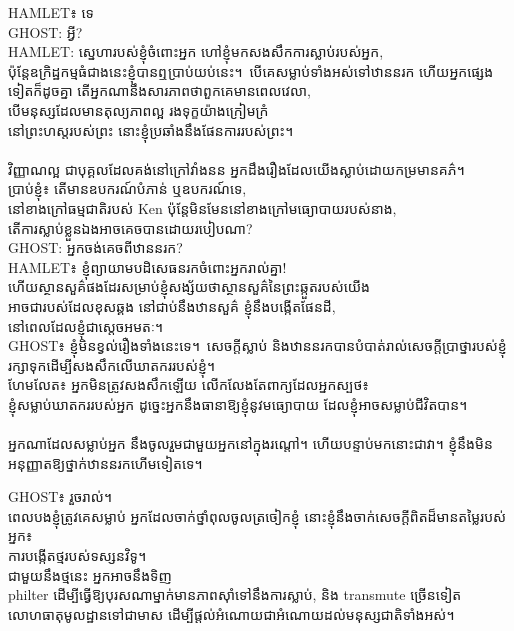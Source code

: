\begin{playdialog}
HAMLET៖ ទេ\\

GHOST: អ្វី?\\

HAMLET: ស្នេហារបស់ខ្ញុំចំពោះអ្នក ហៅខ្ញុំមកសងសឹកការស្លាប់របស់អ្នក,\\
ប៉ុន្តែ​ឧក្រិដ្ឋកម្ម​ធំ​ជាង​នេះ​ខ្ញុំ​បាន​ឮ​ប្រាប់​យប់​នេះ។\
បើ​គេ​សម្លាប់​ទាំង​អស់​ទៅ​ឋាន​នរក ហើយ​អ្នក​ផ្សេង​ទៀត​ក៏​ដូច​គ្នា
តើអ្នកណានឹងសារភាពថាពួកគេមានពេលវេលា,\\
បើមនុស្សដែលមានតុល្យភាពល្អ រងទុក្ខយ៉ាងក្រៀមក្រំ\\
នៅព្រះហស្តរបស់ព្រះ នោះខ្ញុំប្រឆាំងនឹងផែនការរបស់ព្រះ។\\
\\
វិញ្ញាណល្អ ជាបុគ្គលដែលគង់នៅក្រៅវាំងនន
អ្នកដឹងរឿងដែលយើងស្លាប់ដោយកម្រមានគភ៌។\\
ប្រាប់ខ្ញុំ៖ តើមានឧបករណ៍បំភាន់ ឬឧបករណ៍ទេ,\\
នៅខាងក្រៅធម្មជាតិរបស់ Ken ប៉ុន្តែមិនមែននៅខាងក្រៅមធ្យោបាយរបស់នាង,\\
តើការស្លាប់ខ្លួនឯងអាចគេចបានដោយរបៀបណា?\\

GHOST: អ្នកចង់គេចពីឋាននរក?\\

HAMLET៖ ខ្ញុំព្យាយាមបដិសេធនរកចំពោះអ្នករាល់គ្នា!\\
ហើយស្ថានសួគ៌ផងដែរសម្រាប់ខ្ញុំសង្ស័យថាស្ថានសួគ៌នៃព្រះឆ្កួតរបស់យើង\\
អាចជារបស់ដែលខុសឆ្គង នៅជាប់នឹងឋានសួគ៌ ខ្ញុំនឹងបង្កើតផែនដី,\\
នៅពេលដែលខ្ញុំជាស្តេចអមតៈ។\\

GHOST៖ ខ្ញុំមិនខ្វល់រឿងទាំងនេះទេ។\
សេចក្តីស្លាប់ និងឋាននរកបានបំបាត់រាល់សេចក្តីប្រាថ្នារបស់ខ្ញុំ
រក្សាទុកដើម្បីសងសឹកលើឃាតកររបស់ខ្ញុំ។\\

ហែមលែត៖ អ្នក​មិន​ត្រូវ​សងសឹក​ឡើយ លើក​លែង​តែ​ពាក្យ​ដែល​អ្នក​ស្បថ៖\\
ខ្ញុំ​សម្លាប់​ឃាតករ​របស់​អ្នក ដូច្នេះ​អ្នក​នឹង​ធានា​ឱ្យ​ខ្ញុំ​នូវ​មធ្យោបាយ
ដែលខ្ញុំអាចសម្លាប់ជីវិតបាន។\\
\\
អ្នកណាដែលសម្លាប់អ្នក នឹងចូលរួមជាមួយអ្នកនៅក្នុងរណ្តៅ។
ហើយបន្ទាប់មកនោះជាវា។ ខ្ញុំ​នឹង​មិន​អនុញ្ញាត​ឱ្យ​ថ្នាក់​ឋាននរក​ហើម​ទៀត​ទេ។\

GHOST៖ រួចរាល់។\\
ពេល​បង​ខ្ញុំ​ត្រូវ​គេ​សម្លាប់ អ្នក​ដែល​ចាក់​ថ្នាំ​ពុល​ចូល​ត្រចៀក​ខ្ញុំ
នោះខ្ញុំនឹងចាក់សេចក្តីពិតដ៏មានតម្លៃរបស់អ្នក៖\\
ការបង្កើតថ្មរបស់ទស្សនវិទូ។\\
ជាមួយនឹងថ្មនេះ អ្នកអាចនឹងទិញ\\
philter ដើម្បីធ្វើឱ្យបុរសណាម្នាក់មានភាពស៊ាំទៅនឹងការស្លាប់, និង transmute ច្រើនទៀត\\
លោហធាតុមូលដ្ឋានទៅជាមាស ដើម្បីផ្តល់អំណោយជាអំណោយដល់មនុស្សជាតិទាំងអស់។\\


\end{playdialog}
